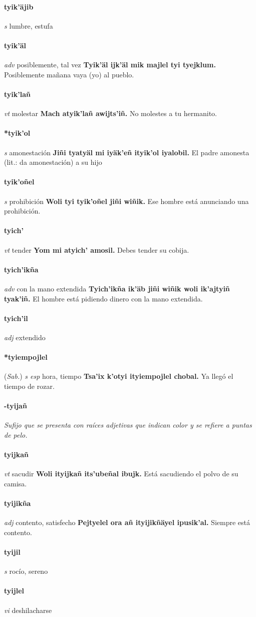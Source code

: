 \documentclass{scrbook}
\newcommand{\entry}[1]{\paragraph{#1}}
\newcommand{\nontranslationdef}[1]{\textit{#1}}
\newcommand{\partofspeech}[1]{\textit{#1}}
\newcommand{\spanishtranslation}[1]{#1}
\newcommand{\cholexample}[1]{\textbf{#1}}
\newcommand{\exampletranslation}[1]{#1}
\newcommand{\relevantdialect}[1]{(\textit{#1})}
\begin{document}
\begin{multicols}{2}
\entry{tyik'äjib}
\partofspeech{s}
\spanishtranslation{lumbre, estufa}

\entry{tyik'äl}
\partofspeech{adv}
\spanishtranslation{posiblemente, tal vez}
\cholexample{Tyik'äl ijk'äl mik majlel tyi tyejklum.}
\exampletranslation{Posiblemente mañana vaya (yo) al pueblo.}

\entry{tyik'lañ}
\partofspeech{vt}
\spanishtranslation{molestar}
\cholexample{Mach atyik'lañ awijts'iñ.}
\exampletranslation{No molestes a tu hermanito.}

\entry{*tyik'ol}
\partofspeech{s}
\spanishtranslation{amonestación}
\cholexample{Jiñi tyatyäl mi iyäk'eñ ityik'ol iyalobil.}
\exampletranslation{El padre amonesta (lit.: da amonestación) a su hijo}

\entry{tyik'oñel}
\partofspeech{s}
\spanishtranslation{prohibición}
\cholexample{Woli tyi tyik'oñel jiñi wiñik.}
\exampletranslation{Ese hombre está anunciando una prohibición.}

\entry{tyich'}
\partofspeech{vt}
\spanishtranslation{tender}
\cholexample{Yom mi atyich' amosil.}
\exampletranslation{Debes tender su cobija.}

\entry{tyich'ikña}
\partofspeech{adv}
\spanishtranslation{con la mano extendida}
\cholexample{Tyich'ikña ik'äb jiñi wiñik woli ik'ajtyiñ tyak'iñ.}
\exampletranslation{El hombre está pidiendo dinero con la mano extendida.}

\entry{tyich'il}
\partofspeech{adj}
\spanishtranslation{extendido}

\entry{*tyiempojlel}
\relevantdialect{Sab.}
\partofspeech{s esp}
\spanishtranslation{hora, tiempo}
\cholexample{Tsa'ix k'otyi ityiempojlel chobal.}
\exampletranslation{Ya llegó el tiempo de rozar.}

\entry{-tyijañ}
\nontranslationdef{Sufijo que se presenta con raíces adjetivas que indican color y se refiere a puntas de pelo.}

\entry{tyijkañ}
\partofspeech{vt}
\spanishtranslation{sacudir}
\cholexample{Woli ityijkañ its'ubeñal ibujk.}
\exampletranslation{Está sacudiendo el polvo de su camisa.}

\entry{tyijikña}
\partofspeech{adj}
\spanishtranslation{contento, satisfecho}
\cholexample{Pejtyelel ora añ ityijikñäyel ipusik'al.}
\exampletranslation{Siempre está contento.}

\entry{tyijil}
\partofspeech{s}
\spanishtranslation{rocío, sereno}

\entry{tyijlel}
\partofspeech{vi}
\spanishtranslation{deshilacharse}


\end{multicols}
\end{document}
